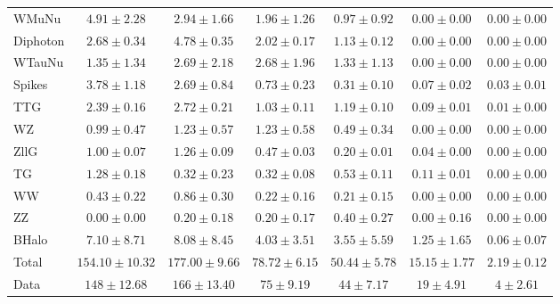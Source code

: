 \begin{table}[htbp]
\begin{center}
\begin{tabular}{|l|c|c|c|c|c|c|}
      WMuNu & $4.91{\pm}2.28$ & $2.94{\pm}1.66$ & $1.96{\pm}1.26$ & $0.97{\pm}0.92$ & $0.00{\pm}0.00$ & $0.00{\pm}0.00$ \\
      Diphoton & $2.68{\pm}0.34$ & $4.78{\pm}0.35$ & $2.02{\pm}0.17$ & $1.13{\pm}0.12$ & $0.00{\pm}0.00$ & $0.00{\pm}0.00$ \\
      WTauNu & $1.35{\pm}1.34$ & $2.69{\pm}2.18$ & $2.68{\pm}1.96$ & $1.33{\pm}1.13$ & $0.00{\pm}0.00$ & $0.00{\pm}0.00$ \\
      Spikes & $3.78{\pm}1.18$ & $2.69{\pm}0.84$ & $0.73{\pm}0.23$ & $0.31{\pm}0.10$ & $0.07{\pm}0.02$ & $0.03{\pm}0.01$ \\
      TTG & $2.39{\pm}0.16$ & $2.72{\pm}0.21$ & $1.03{\pm}0.11$ & $1.19{\pm}0.10$ & $0.09{\pm}0.01$ & $0.01{\pm}0.00$ \\
      WZ & $0.99{\pm}0.47$ & $1.23{\pm}0.57$ & $1.23{\pm}0.58$ & $0.49{\pm}0.34$ & $0.00{\pm}0.00$ & $0.00{\pm}0.00$ \\
      ZllG & $1.00{\pm}0.07$ & $1.26{\pm}0.09$ & $0.47{\pm}0.03$ & $0.20{\pm}0.01$ & $0.04{\pm}0.00$ & $0.00{\pm}0.00$ \\
      TG & $1.28{\pm}0.18$ & $0.32{\pm}0.23$ & $0.32{\pm}0.08$ & $0.53{\pm}0.11$ & $0.11{\pm}0.01$ & $0.00{\pm}0.00$ \\
      WW & $0.43{\pm}0.22$ & $0.86{\pm}0.30$ & $0.22{\pm}0.16$ & $0.21{\pm}0.15$ & $0.00{\pm}0.00$ & $0.00{\pm}0.00$ \\
      ZZ & $0.00{\pm}0.00$ & $0.20{\pm}0.18$ & $0.20{\pm}0.17$ & $0.40{\pm}0.27$ & $0.00{\pm}0.16$ & $0.00{\pm}0.00$ \\
      BHalo & $7.10{\pm}8.71$ & $8.08{\pm}8.45$ & $4.03{\pm}3.51$ & $3.55{\pm}5.59$ & $1.25{\pm}1.65$ & $0.06{\pm}0.07$ \\
      \hline
      Total & $154.10{\pm}10.32$ & $177.00{\pm}9.66$ & $78.72{\pm}6.15$ & $50.44{\pm}5.78$ & $15.15{\pm}1.77$ & $2.19{\pm}0.12$ \\
      \hline
      Data & $148{\pm}12.68$ & $166{\pm}13.40$ & $75{\pm}9.19$ & $44{\pm}7.17$ & $19{\pm}4.91$ & $4{\pm}2.61$ \\
      \hline
    \end{tabular}
  \end{center}
\end{table}

